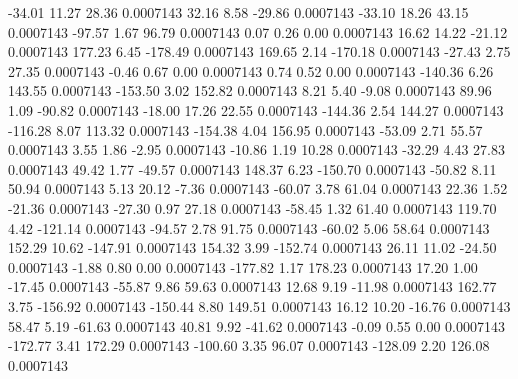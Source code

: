       -34.01       11.27       28.36     0.0007143
       32.16        8.58      -29.86     0.0007143
      -33.10       18.26       43.15     0.0007143
      -97.57        1.67       96.79     0.0007143
        0.07        0.26        0.00     0.0007143
       16.62       14.22      -21.12     0.0007143
      177.23        6.45     -178.49     0.0007143
      169.65        2.14     -170.18     0.0007143
      -27.43        2.75       27.35     0.0007143
       -0.46        0.67        0.00     0.0007143
        0.74        0.52        0.00     0.0007143
     -140.36        6.26      143.55     0.0007143
     -153.50        3.02      152.82     0.0007143
        8.21        5.40       -9.08     0.0007143
       89.96        1.09      -90.82     0.0007143
      -18.00       17.26       22.55     0.0007143
     -144.36        2.54      144.27     0.0007143
     -116.28        8.07      113.32     0.0007143
     -154.38        4.04      156.95     0.0007143
      -53.09        2.71       55.57     0.0007143
        3.55        1.86       -2.95     0.0007143
      -10.86        1.19       10.28     0.0007143
      -32.29        4.43       27.83     0.0007143
       49.42        1.77      -49.57     0.0007143
      148.37        6.23     -150.70     0.0007143
      -50.82        8.11       50.94     0.0007143
        5.13       20.12       -7.36     0.0007143
      -60.07        3.78       61.04     0.0007143
       22.36        1.52      -21.36     0.0007143
      -27.30        0.97       27.18     0.0007143
      -58.45        1.32       61.40     0.0007143
      119.70        4.42     -121.14     0.0007143
      -94.57        2.78       91.75     0.0007143
      -60.02        5.06       58.64     0.0007143
      152.29       10.62     -147.91     0.0007143
      154.32        3.99     -152.74     0.0007143
       26.11       11.02      -24.50     0.0007143
       -1.88        0.80        0.00     0.0007143
     -177.82        1.17      178.23     0.0007143
       17.20        1.00      -17.45     0.0007143
      -55.87        9.86       59.63     0.0007143
       12.68        9.19      -11.98     0.0007143
      162.77        3.75     -156.92     0.0007143
     -150.44        8.80      149.51     0.0007143
       16.12       10.20      -16.76     0.0007143
       58.47        5.19      -61.63     0.0007143
       40.81        9.92      -41.62     0.0007143
       -0.09        0.55        0.00     0.0007143
     -172.77        3.41      172.29     0.0007143
     -100.60        3.35       96.07     0.0007143
     -128.09        2.20      126.08     0.0007143
